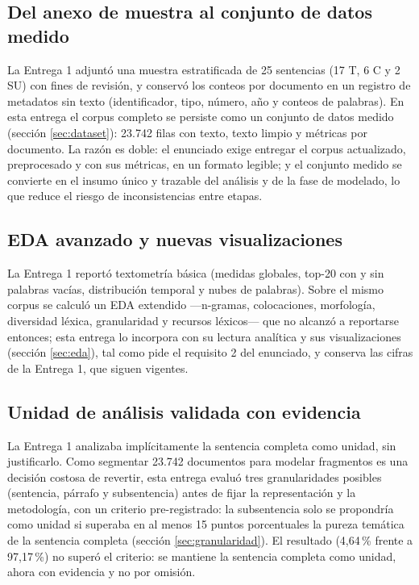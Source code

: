 \documentclass[11pt]{tg_usta}
\begin{document}
\subsection{Del anexo de muestra al conjunto de datos medido}
La Entrega 1 adjuntó una muestra estratificada de 25 sentencias (17 T, 6 C y 2 SU) con fines de revisión, y conservó los conteos por documento en un registro de metadatos sin texto (identificador, tipo, número, año y conteos de palabras). En esta entrega el corpus completo se persiste como un conjunto de datos medido (sección \ref{sec:dataset}): 23.742 filas con texto, texto limpio y métricas por documento. La razón es doble: el enunciado exige entregar el corpus actualizado, preprocesado y con sus métricas, en un formato legible; y el conjunto medido se convierte en el insumo único y trazable del análisis y de la fase de modelado, lo que reduce el riesgo de inconsistencias entre etapas.

\subsection{EDA avanzado y nuevas visualizaciones}
La Entrega 1 reportó textometría básica (medidas globales, top-20 con y sin palabras vacías, distribución temporal y nubes de palabras). Sobre el mismo corpus se calculó un EDA extendido ---n-gramas, colocaciones, morfología, diversidad léxica, granularidad y recursos léxicos--- que no alcanzó a reportarse entonces; esta entrega lo incorpora con su lectura analítica y sus visualizaciones (sección \ref{sec:eda}), tal como pide el requisito 2 del enunciado, y conserva las cifras de la Entrega 1, que siguen vigentes.

\subsection{Unidad de análisis validada con evidencia}
La Entrega 1 analizaba implícitamente la sentencia completa como unidad, sin justificarlo. Como segmentar 23.742 documentos para modelar fragmentos es una decisión costosa de revertir, esta entrega evaluó tres granularidades posibles (sentencia, párrafo y subsentencia) antes de fijar la representación y la metodología, con un criterio pre-registrado: la subsentencia solo se propondría como unidad si superaba en al menos 15 puntos porcentuales la pureza temática de la sentencia completa (sección \ref{sec:granularidad}). El resultado (4,64\,\% frente a 97,17\,\%) no superó el criterio: se mantiene la sentencia completa como unidad, ahora con evidencia y no por omisión.
\end{document}

